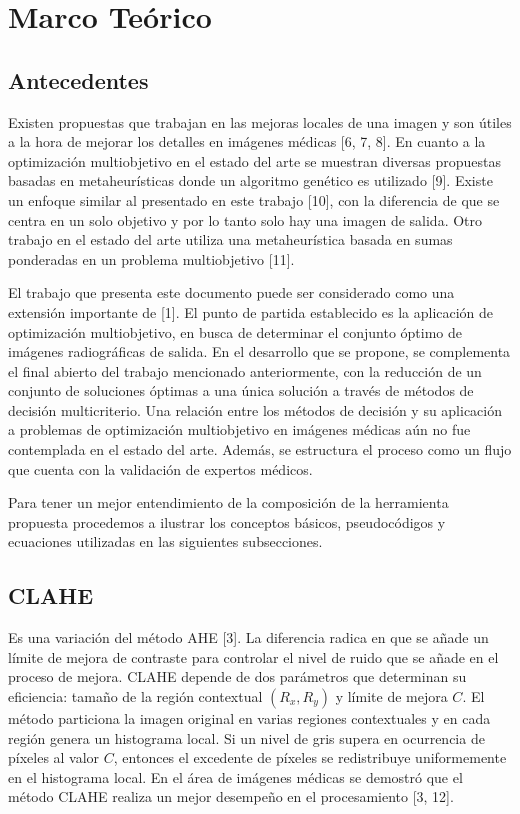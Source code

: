 \documentclass[sigplan,screen]{acmart}
\begin{document}
\section{Marco Teórico}

\subsection{Antecedentes}
Existen propuestas que trabajan en las mejoras locales de una imagen y son útiles a la hora de mejorar los detalles en imágenes médicas [6, 7, 8]. En cuanto a la optimización multiobjetivo en el estado del arte se muestran diversas propuestas basadas en metaheurísticas donde un algoritmo genético es utilizado [9]. Existe un enfoque similar al presentado en este trabajo [10], con la diferencia de que se centra en un solo objetivo y por lo tanto solo hay una imagen de salida. Otro trabajo en el estado del arte utiliza una metaheurística basada en sumas ponderadas en un problema multiobjetivo [11].\par
El trabajo que presenta este documento puede ser considerado como una extensión importante de [1]. El punto de partida establecido es la aplicación de optimización multiobjetivo, en busca de determinar el conjunto óptimo de imágenes radiográficas de salida. En el desarrollo que se propone, se complementa el final abierto del trabajo mencionado anteriormente, con la reducción de un conjunto de soluciones óptimas a una única solución a través de métodos de decisión multicriterio. Una relación entre los métodos de decisión y su aplicación a problemas de optimización multiobjetivo en imágenes médicas aún no fue contemplada en el estado del arte. Además, se estructura el proceso como un flujo que cuenta con la validación de expertos médicos.\par
Para tener un mejor entendimiento de la composición de la herramienta propuesta procedemos a ilustrar los conceptos básicos, pseudocódigos y ecuaciones utilizadas en las siguientes subsecciones.

\subsection{CLAHE}
Es una variación del método AHE [3]. La diferencia radica en que se añade un límite de mejora de contraste para controlar el nivel de ruido que se añade en el proceso de mejora. CLAHE depende de dos parámetros que determinan su eficiencia: tamaño de la región contextual $(R_x,R_y)$ y límite de mejora $C$. El método particiona la imagen original en varias regiones contextuales y en cada región genera un histograma local. Si un nivel de gris supera en ocurrencia de píxeles al valor $C$, entonces el excedente de píxeles se redistribuye uniformemente en el histograma local. En el área de imágenes médicas se demostró que el método CLAHE realiza un mejor desempeño en el procesamiento [3, 12].
\end{document}
